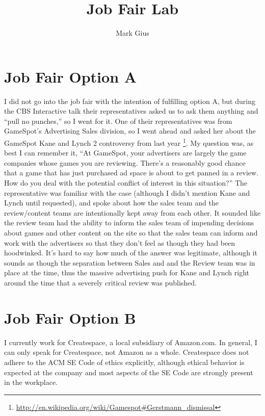 \documentclass[12pt]{article}
\begin{document}
\author{Mark Gius}
\title{Job Fair Lab}
\maketitle

\section{Job Fair Option A}

\doublespacing

I did not go into the job fair with the intention of fulfilling option A, but during the CBS Interactive talk their representatives asked us to ask them anything and ``pull no punches,'' so I went for it.  One of their representatives was from GameSpot's Advertising Sales division, so I went ahead and asked her about the GameSpot Kane and Lynch 2 controversy from last year \footnote{\url{http://en.wikipedia.org/wiki/Gamespot#Gerstmann_dismissal}}.  My question was, as best I can remember it, ``At GameSpot, your advertisers are largely the game companies whose games you are reviewing.  There's a reasonably good chance that a game that has just purchased ad space is about to get panned in a review.  How do you deal with the potential conflict of interest in this situation?'' The representative was familiar with the case (although I didn't mention Kane and Lynch until requested), and spoke about how the sales team and the review/content teams are intentionally kept away from each other.  It sounded like the review team had the ability to inform the sales team of impending decisions about games and other content on the site so that the sales team can inform and work with the advertisers so that they don't feel as though they had been hoodwinked.  It's hard to say how much of the answer was legitimate, although it sounds as though the separation between Sales and and the Review team was in place at the time, thus the massive advertising push for Kane and Lynch right around the time that a severely critical review was published.

\singlespacing

\section{Job Fair Option B}

\doublespacing
I currently work for Createspace, a local subsidiary of Amazon.com.  In general, I can only speak for Createspace, not Amazon as a whole. Createspace does not adhere to the ACM SE Code of ethics explicitly, although ethical behavior is expected at the company and most aspects of the SE Code are strongly present in the workplace.  
\end{document}
